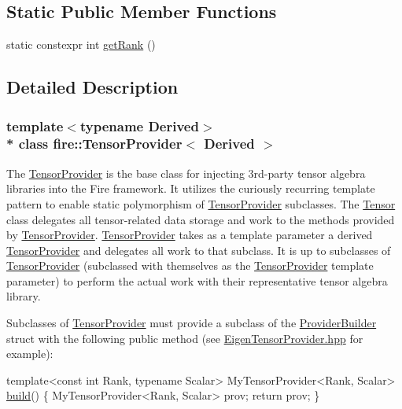 \subsection*{Static Public Member Functions}
\begin{DoxyCompactItemize}
\item 
static constexpr int \hyperlink{a00300_aed1bf408a6ead1bae3b5bd96cda2cfad}{get\+Rank} ()
\end{DoxyCompactItemize}


\subsection{Detailed Description}
\subsubsection*{template$<$typename Derived$>$\\*
class fire\+::\+Tensor\+Provider$<$ Derived $>$}

The \hyperlink{a00300}{Tensor\+Provider} is the base class for injecting 3rd-\/party tensor algebra libraries into the Fire framework. It utilizes the curiously recurring template pattern to enable static polymorphism of \hyperlink{a00300}{Tensor\+Provider} subclasses. The \hyperlink{a00299}{Tensor} class delegates all tensor-\/related data storage and work to the methods provided by \hyperlink{a00300}{Tensor\+Provider}. \hyperlink{a00300}{Tensor\+Provider} takes as a template parameter a derived \hyperlink{a00300}{Tensor\+Provider} and delegates all work to that subclass. It is up to subclasses of \hyperlink{a00300}{Tensor\+Provider} (subclassed with themselves as the \hyperlink{a00300}{Tensor\+Provider} template parameter) to perform the actual work with their representative tensor algebra library.

Subclasses of \hyperlink{a00300}{Tensor\+Provider} must provide a subclass of the \hyperlink{a00235}{Provider\+Builder} struct with the following public method (see \hyperlink{a00483_source}{Eigen\+Tensor\+Provider.\+hpp} for example)\+:


\begin{DoxyCode}
   \textcolor{keyword}{template}<const \textcolor{keywordtype}{int} Rank, \textcolor{keyword}{typename} Scalar>
MyTensorProvider<Rank, Scalar> \hyperlink{a00822_abca66b4f2a1543308b663714bd8b4855}{build}() \{
   MyTensorProvider<Rank, Scalar> prov;
   \textcolor{keywordflow}{return} prov;
\}
\end{DoxyCode}


